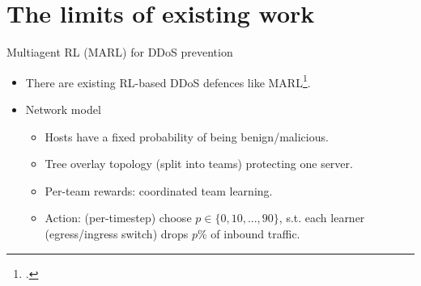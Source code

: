 \documentclass[aspectratio=169,xcolor={dvipsnames}
,hide notes
]{beamer}
\begin{document}


\section{The limits of existing work}

\begin{frame}{Multiagent RL (MARL) for DDoS prevention}
%	
%	
%
	
	\begin{itemize}
		\item There are existing RL-based DDoS defences like MARL\footcite{DBLP:journals/eaai/MalialisK15}.
		
		\item Network model
		\begin{itemize}
			\item Hosts have a fixed probability of being benign/malicious.
			\item Tree overlay topology (split into teams) protecting one server.
			\item Per-team rewards: \alert{coordinated team learning}.
			\item Action: (per-timestep) choose $p\in\{0,10,...,90\}$, s.t. each learner (egress/ingress switch) drops $p\%$ of inbound traffic.
		\end{itemize}
	
	\end{itemize}
\end{frame}
\end{document}

